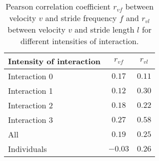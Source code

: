 \begin{table}
\centering
\caption{Pearson correlation coefficient $r_{vf}$ between velocity $v$ and stride frequency $f$ and $r_{vl}$ between velocity $v$ and stride length $l$ for different intensities of interaction.}
\label{tab:pearson_correlation}
\begin{tabular}{lcc}
\toprule
Intensity of interaction & $r_{vf}$ & $r_{vl}$ \\
\midrule
Interaction 0 & $0.17$ & $0.11$ \\
Interaction 1 & $0.12$ & $0.30$ \\
Interaction 2 & $0.18$ & $0.22$ \\
Interaction 3 & $0.27$ & $0.58$ \\
\midrule
All & $0.19$ & $0.25$ \\
Individuals & $-0.03$ & $0.26$ \\
\bottomrule
\end{tabular}
\end{table}
